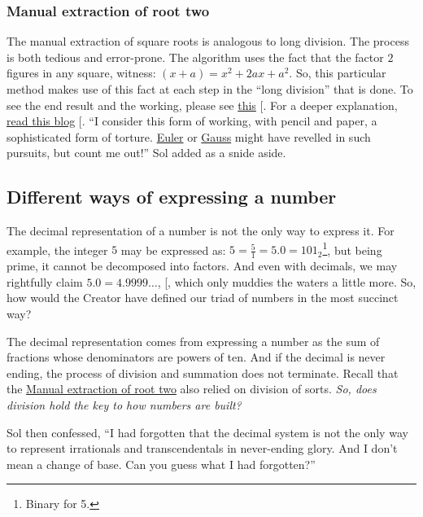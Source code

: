 \documentclass[
  a4paper,
]{article}
\begin{document}
\subsubsection{Manual extraction of root
two}\label{manual-extraction-of-root-two}

The manual extraction of square roots is analogous to long division. The
process is both tedious and error-prone. The algorithm uses the fact
that the factor \(2\) figures in any square, witness:
\((x + a) = x^2 + 2ax +a^2\). So, this particular method makes use of
this fact at each step in the ``long division'' that is done. To see the
end result and the working, please see
\href{https://www.cuemath.com/algebra/square-root-of-2/}{this}
{[}\citeproc{ref-cuemathsqrt}{4}{]}. For a deeper explanation,
\href{https://www.cantorsparadise.com/the-square-root-algorithm-f97ab5c29d6d}{read
this blog} {[}\citeproc{ref-ujjwalsingh2021}{5}{]}. ``I consider this
form of working, with pencil and paper, a sophisticated form of torture.
\href{https://en.wikipedia.org/wiki/Leonhard_Euler}{Euler} or
\href{https://en.wikipedia.org/wiki/Carl_Friedrich_Gauss}{Gauss} might
have revelled in such pursuits, but count me out!'' Sol added as a snide
aside.

\subsection{Different ways of expressing a
number}\label{different-ways-of-expressing-a-number}

The decimal representation of a number is not the only way to express
it. For example, the integer \(5\) may be expressed as:
\(5 = \frac{5}{1} = 5.0 = 101_2\)\footnote{Binary for 5.}, but being
prime, it cannot be decomposed into factors. And even with decimals, we
may rightfully claim \(5.0 = 4.9999\dots\),
{[}\citeproc{ref-courant-robbins-1996}{6}{]}, which only muddies the
waters a little more. So, how would the Creator have defined our triad
of numbers in the most succinct way?

The decimal representation comes from expressing a number as the sum of
fractions whose denominators are powers of ten. And if the decimal is
never ending, the process of division and summation does not terminate.
Recall that the \hyperref[manual-extraction-of-root-two]{Manual
extraction of root two} also relied on division of sorts. \emph{So, does
division hold the key to how numbers are built?}

Sol then confessed, ``I had forgotten that the decimal system is not the
only way to represent irrationals and transcendentals in never-ending
glory. And I don't mean a change of base. Can you guess what I had
forgotten?''
\end{document}
